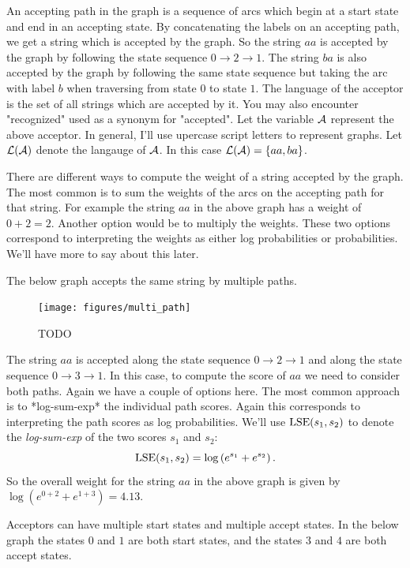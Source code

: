 \documentclass[main.tex]{subfiles}
\begin{document}
An accepting path in the graph is a sequence of arcs which begin at a start
state and end in an accepting state. By concatenating the labels on an
accepting path, we get a string which is accepted by the graph. So the string
$aa$ is accepted by the graph by following the state sequence $0 \rightarrow 2
\rightarrow 1$. The string $ba$ is also accepted by the graph by following the
same state sequence but taking the arc with label $b$ when traversing from
state $0$ to state $1$. The language of the acceptor is the set of all strings
which are accepted by it. You may also encounter "recognized" used as a synonym
for "accepted". Let the variable $\mathcal{A}$ represent the above acceptor. In
general, I'll use upercase script letters to represent graphs. Let
$\mathcal{L}(\mathcal{A})$ denote the langauge of $\mathcal{A}$. In this case $\mathcal{L}(\mathcal{A})
= \{aa, ba\}$.

There are different ways to compute the weight of a string accepted by the
graph. The most common is to sum the weights of the arcs on the accepting path
for that string. For example the string $aa$ in the above graph has a weight of
$0 + 2 = 2$. Another option would be to multiply the weights. These two options
correspond to interpreting the weights as either log probabilities or
probabilities. We'll have more to say about this later.

The below graph accepts the same string by multiple paths.

\begin{figure}
    \centering
    \texttt{[image: figures/multi\_path]}
    \caption{TODO}
    \label{fig:simple_fsa}
\end{figure}

The string $aa$ is accepted along the state sequence $0 \rightarrow 2
\rightarrow 1$ and along the state sequence $0 \rightarrow 3 \rightarrow 1$. In
this case, to compute the score of $aa$ we need to consider both paths. Again
we have a couple of options here. The most common approach is to *log-sum-exp*
the individual path scores. Again this corresponds to interpreting the path
scores as log probabilities. We'll use $\operatorname*{\textrm{LSE}}(s_1, s_2)$ to denote the
\emph{log-sum-exp} of the two scores $s_1$ and $s_2$:
\begin{equation}
\operatorname*{\textrm{LSE}}(s_1, s_2) = \log \left( e^{s_1} + e^{s_2}\right).
\end{equation}
So the overall weight for the string $aa$ in the above graph is given by $\log
\left(e^{0 + 2} + e^{1 + 3}\right) = 4.13$.

Acceptors can have multiple start states and multiple accept states. In the
below graph the states $0$ and $1$ are both start states, and the states $3$
and $4$ are both accept states.
\end{document}
